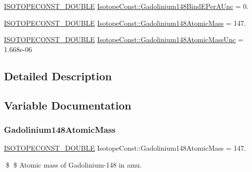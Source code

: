 \begin{DoxyCompactItemize}
\item 
\mbox{\hyperlink{group___isotope_const-_macros_ga8f45a7272ce02c0b4c65c44636ed719a}{I\+S\+O\+T\+O\+P\+E\+C\+O\+N\+S\+T\+\_\+\+D\+O\+U\+B\+LE}} \mbox{\hyperlink{group___isotope_const-_gadolinium-_gd148_gad9f6fb23449bfa7c504e4f56b101f226}{Isotope\+Const\+::\+Gadolinium148\+Bind\+E\+Per\+A\+Unc}} = 0.
\item 
\mbox{\hyperlink{group___isotope_const-_macros_ga8f45a7272ce02c0b4c65c44636ed719a}{I\+S\+O\+T\+O\+P\+E\+C\+O\+N\+S\+T\+\_\+\+D\+O\+U\+B\+LE}} \mbox{\hyperlink{group___isotope_const-_gadolinium-_gd148_ga5044ea9f9621d6a748dcd49b194f39e7}{Isotope\+Const\+::\+Gadolinium148\+Atomic\+Mass}} = 147.
\item 
\mbox{\hyperlink{group___isotope_const-_macros_ga8f45a7272ce02c0b4c65c44636ed719a}{I\+S\+O\+T\+O\+P\+E\+C\+O\+N\+S\+T\+\_\+\+D\+O\+U\+B\+LE}} \mbox{\hyperlink{group___isotope_const-_gadolinium-_gd148_ga7727caf328bb152fddfcbee317e988cb}{Isotope\+Const\+::\+Gadolinium148\+Atomic\+Mass\+Unc}} = 1.\+668e-\/06
\end{DoxyCompactItemize}


\subsection{Detailed Description}


\subsection{Variable Documentation}
\mbox{\label{group___isotope_const-_gadolinium-_gd148_ga5044ea9f9621d6a748dcd49b194f39e7}} 
\subsubsection{\texorpdfstring{Gadolinium148\+Atomic\+Mass}{Gadolinium148AtomicMass}}
{\footnotesize\ttfamily \mbox{\hyperlink{group___isotope_const-_macros_ga8f45a7272ce02c0b4c65c44636ed719a}{I\+S\+O\+T\+O\+P\+E\+C\+O\+N\+S\+T\+\_\+\+D\+O\+U\+B\+LE}} Isotope\+Const\+::\+Gadolinium148\+Atomic\+Mass = 147.}

\$ \$ Atomic mass of Gadolinium-\/148 in amu. \mbox{\label{group___isotope_const-_gadolinium-_gd148_ga7727caf328bb152fddfcbee317e988cb}} 
